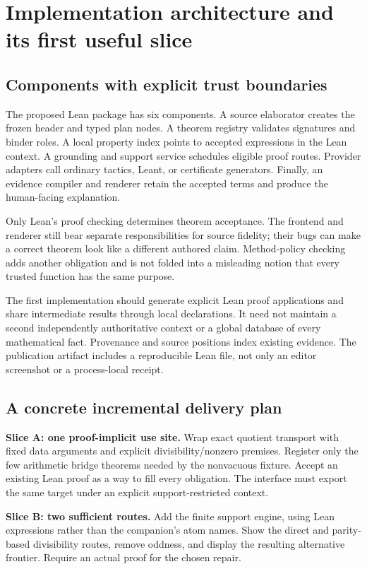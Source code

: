 \documentclass[11pt,a4paper]{article}
\numberwithin{equation}{section}
\theoremstyle{definition}\newtheorem{definition}[theorem]{Definition}
\theoremstyle{remark}\newtheorem{remark}[theorem]{Remark}
\begin{document}
\section{Implementation architecture and its first useful slice}\label{sec:implementation}

\subsection{Components with explicit trust boundaries}
The proposed Lean package has six components. A source elaborator creates the
frozen header and typed plan nodes. A theorem registry validates signatures
and binder roles. A local property index points to accepted expressions in the
Lean context. A grounding and support service schedules eligible proof routes.
Provider adapters call ordinary tactics, Leant, or certificate generators.
Finally, an evidence compiler and renderer retain the accepted terms and
produce the human-facing explanation.

Only Lean's proof checking determines theorem acceptance. The frontend and
renderer still bear separate responsibilities for source fidelity; their bugs
can make a correct theorem look like a different authored claim. Method-policy
checking adds another obligation and is not folded into a misleading notion
that every trusted function has the same purpose.

The first implementation should generate explicit Lean proof applications and
share intermediate results through local declarations. It need not maintain
a second independently authoritative context or a global database of every
mathematical fact. Provenance and source positions index existing evidence.
The publication artifact includes a reproducible Lean file, not only an editor
screenshot or a process-local receipt.

\subsection{A concrete incremental delivery plan}
\textbf{Slice A: one proof-implicit use site.} Wrap exact quotient transport
with fixed data arguments and explicit divisibility/nonzero premises. Register
only the few arithmetic bridge theorems needed by the nonvacuous fixture.
Accept an existing Lean proof as a way to fill every obligation. The interface
must export the same target under an explicit support-restricted context.

\textbf{Slice B: two sufficient routes.} Add the finite support engine, using
Lean expressions rather than the companion's atom names. Show the direct
and parity-based divisibility routes, remove oddness, and display the
resulting alternative frontier. Require an actual proof for the chosen repair.
\end{document}
